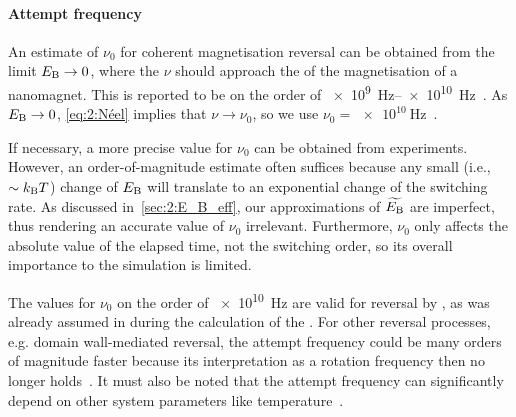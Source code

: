 \paragraph{Attempt frequency}
An estimate of $\nu_0$ for coherent magnetisation reversal can be obtained from the limit $E_\mathrm{B} \rightarrow 0$, where the  $\nu$ should approach the  of the magnetisation of a nanomagnet.
This is reported to be on the order of \qtyrange{e9}{e10}{\hertz}~\cite{BrownThermalFluctuations,bean1959superparamagnetism}.
As $E_\mathrm{B} \rightarrow 0$, \cref{eq:2:Néel} implies that $\nu \rightarrow \nu_0$, so we use $\nu_0=\qty{e10}{\hertz}$~\cite{JM_Masterproef}. \par %
If necessary, a more precise value for $\nu_0$ can be obtained from experiments.
However, an order-of-magnitude estimate often suffices because any small (i.e., $\sim \kBT$) change of $E_\mathrm{B}$ will translate to an exponential change of the switching rate.
As discussed in~\cref{sec:2:E_B_eff}, our approximations of $\widetilde{E_\mathrm{B}}$ are imperfect, thus rendering an accurate value of $\nu_0$ irrelevant.
Furthermore, $\nu_0$ only affects the absolute value of the elapsed time, not the switching order, so its overall importance to the simulation is limited. \par
The values for $\nu_0$ on the order of \SI{e10}{\hertz} are valid for reversal by , as was already assumed in \hotspice during the calculation of the .
For other reversal processes, e.g. domain wall-mediated reversal, the attempt frequency could be many orders of magnitude faster because its interpretation as a rotation frequency then no longer holds~\cite{ArrheniusPrefactor}. %
It must also be noted that the attempt frequency can significantly depend on other system parameters like temperature~\cite{AttemptFreqTemperature}. %

